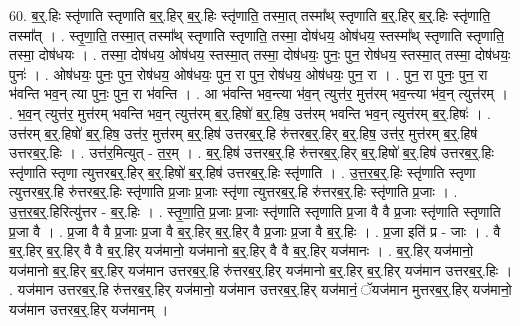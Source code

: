 \documentclass[17pt]{extarticle}
\begin{document}
60. ब॒र्॒.हिः स्तृ॑णाति स्तृणाति ब॒र्॒.हिर् ब॒र्॒.हिः स्तृ॑णाति॒ तस्मा॒त् तस्मा᳚थ् स्तृणाति ब॒र्॒.हिर् ब॒र्॒.हिः स्तृ॑णाति॒ तस्मा᳚त् । . स्तृ॒णा॒ति॒ तस्मा॒त् तस्मा᳚थ् स्तृणाति स्तृणाति॒ तस्मा॒ दोष॑धय॒ ओष॑धय॒ स्तस्मा᳚थ् स्तृणाति स्तृणाति॒ तस्मा॒ दोष॑धयः । . तस्मा॒ दोष॑धय॒ ओष॑धय॒ स्तस्मा॒त् तस्मा॒ दोष॑धयः॒ पुनः॒ पुन॒ रोष॑धय॒ स्तस्मा॒त् तस्मा॒ दोष॑धयः॒ पुनः॑ । . ओष॑धयः॒ पुनः॒ पुन॒ रोष॑धय॒ ओष॑धयः॒ पुन॒ रा पुन॒ रोष॑धय॒ ओष॑धयः॒ पुन॒ रा । . पुन॒ रा पुनः॒ पुन॒ रा भ॑वन्ति भव॒न् त्या पुनः॒ पुन॒ रा भ॑वन्ति । . आ भ॑वन्ति भव॒न्त्या भ॑व॒न् त्युत्त॑र॒ मुत्त॑रम् भव॒न्त्या भ॑व॒न् त्युत्त॑रम् । . भ॒व॒न् त्युत्त॑र॒ मुत्त॑रम् भवन्ति भव॒न् त्युत्त॑रम् ब॒र्॒.हिषो॑ ब॒र्॒.हिष॒ उत्त॑रम् भवन्ति भव॒न् त्युत्त॑रम् ब॒र्॒.हिषः॑ । . उत्त॑रम् ब॒र्॒.हिषो॑ ब॒र्॒.हिष॒ उत्त॑र॒ मुत्त॑रम् ब॒र्॒.हिष॑ उत्तरब॒र्॒.हि रु॑त्तरब॒र्॒.हिर् ब॒र्॒.हिष॒ उत्त॑र॒ मुत्त॑रम् ब॒र्॒.हिष॑ उत्तरब॒र्॒.हिः । . उत्त॑र॒मित्युत् - त॒र॒म् । . ब॒र्॒.हिष॑ उत्तरब॒र्॒.हि रु॑त्तरब॒र्॒.हिर् ब॒र्॒.हिषो॑ ब॒र्॒.हिष॑ उत्तरब॒र्॒.हिः स्तृ॑णाति स्तृणा त्युत्तरब॒र्॒.हिर् ब॒र्॒.हिषो॑ ब॒र्॒.हिष॑ उत्तरब॒र्॒.हिः स्तृ॑णाति । . उ॒त्त॒र॒ब॒र्॒.हिः स्तृ॑णाति स्तृणा त्युत्तरब॒र्॒.हि रु॑त्तरब॒र्॒.हिः स्तृ॑णाति प्र॒जाः प्र॒जाः स्तृ॑णा त्युत्तरब॒र्॒.हि रु॑त्तरब॒र्॒.हिः स्तृ॑णाति प्र॒जाः । . उ॒त्त॒र॒ब॒र्॒.हिरित्यु॑त्तर - ब॒र्॒.हिः । . स्तृ॒णा॒ति॒ प्र॒जाः प्र॒जाः स्तृ॑णाति स्तृणाति प्र॒जा वै वै प्र॒जाः स्तृ॑णाति स्तृणाति प्र॒जा वै । . प्र॒जा वै वै प्र॒जाः प्र॒जा वै ब॒र्॒.हिर् ब॒र्॒.हिर् वै प्र॒जाः प्र॒जा वै ब॒र्॒.हिः । . प्र॒जा इति॑ प्र - जाः । . वै ब॒र्॒.हिर् ब॒र्॒.हिर् वै वै ब॒र्॒.हिर् यज॑मानो॒ यज॑मानो ब॒र्॒.हिर् वै वै ब॒र्॒.हिर् यज॑मानः । . ब॒र्॒.हिर् यज॑मानो॒ यज॑मानो ब॒र्॒.हिर् ब॒र्॒.हिर् यज॑मान उत्तरब॒र्॒.हि रु॑त्तरब॒र्॒.हिर् यज॑मानो ब॒र्॒.हिर् ब॒र्॒.हिर् यज॑मान उत्तरब॒र्॒.हिः । . यज॑मान उत्तरब॒र्॒.हि रु॑त्तरब॒र्॒.हिर् यज॑मानो॒ यज॑मान उत्तरब॒र्॒.हिर् यज॑मानं॒ ॅयज॑मान मुत्तरब॒र्॒.हिर् यज॑मानो॒ यज॑मान उत्तरब॒र्॒.हिर् यज॑मानम् । \newline
\end{document}
